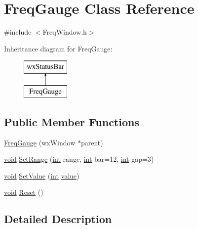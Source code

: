 \hypertarget{class_freq_gauge}{}\section{Freq\+Gauge Class Reference}
\label{class_freq_gauge}


{\ttfamily \#include $<$Freq\+Window.\+h$>$}

Inheritance diagram for Freq\+Gauge\+:\begin{figure}[H]
\begin{center}
\leavevmode
\includegraphics[height=2.000000cm]{class_freq_gauge}
\end{center}
\end{figure}
\subsection*{Public Member Functions}
\begin{DoxyCompactItemize}
\item 
\hyperlink{class_freq_gauge_aa878d10ad278aac82f2f893ad550a65c}{Freq\+Gauge} (wx\+Window $\ast$parent)
\item 
\hyperlink{sound_8c_ae35f5844602719cf66324f4de2a658b3}{void} \hyperlink{class_freq_gauge_a8a051ca0a6645f6f707f57e5ab348743}{Set\+Range} (\hyperlink{xmltok_8h_a5a0d4a5641ce434f1d23533f2b2e6653}{int} range, \hyperlink{xmltok_8h_a5a0d4a5641ce434f1d23533f2b2e6653}{int} bar=12, \hyperlink{xmltok_8h_a5a0d4a5641ce434f1d23533f2b2e6653}{int} gap=3)
\item 
\hyperlink{sound_8c_ae35f5844602719cf66324f4de2a658b3}{void} \hyperlink{class_freq_gauge_ab1cdea1bfcda2705f3919e4bd9c0fc35}{Set\+Value} (\hyperlink{xmltok_8h_a5a0d4a5641ce434f1d23533f2b2e6653}{int} \hyperlink{lib_2expat_8h_a4a30a13b813682e68c5b689b45c65971}{value})
\item 
\hyperlink{sound_8c_ae35f5844602719cf66324f4de2a658b3}{void} \hyperlink{class_freq_gauge_a9d0c846782647fb8f94dd9a646d79a52}{Reset} ()
\end{DoxyCompactItemize}


\subsection{Detailed Description}


